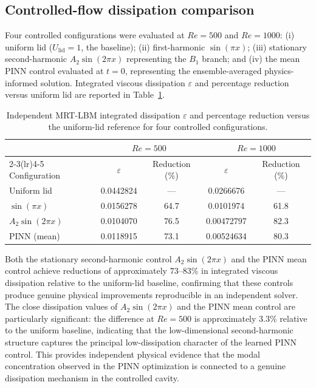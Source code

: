 \documentclass[a4paper,11pt]{article}
\begin{document}
\subsection{Controlled-flow dissipation comparison}

Four controlled configurations were evaluated at \(Re=500\) and \(Re=1000\):
(i) uniform lid (\(U_{\mathrm{lid}}=1\), the baseline); (ii) first-harmonic
\(\sin(\pi x)\); (iii) stationary second-harmonic \(A_2\sin(2\pi x)\) representing
the \(B_1\) branch; and (iv) the mean PINN control evaluated at \(t=0\),
representing the ensemble-averaged physics-informed solution. Integrated viscous
dissipation \(\varepsilon\) and percentage reduction versus uniform lid are
reported in Table~\ref{tab:lbm_dissipation}.

\begin{table}[t]
\centering
\caption{Independent MRT-LBM integrated dissipation \(\varepsilon\) and percentage
reduction versus the uniform-lid reference for four controlled configurations.}
\label{tab:lbm_dissipation}
\small
\begin{tabular}{lcccc}
\toprule
& \multicolumn{2}{c}{\(Re=500\)} & \multicolumn{2}{c}{\(Re=1000\)}\\
\cmidrule(lr){2-3}\cmidrule(lr){4-5}
Configuration & \(\varepsilon\) & Reduction (\%) & \(\varepsilon\) & Reduction (\%)\\
\midrule
Uniform lid         & 0.0442824  & ---  & 0.0266676  & ---\\
\(\sin(\pi x)\)     & 0.0156278  & 64.7 & 0.0101974  & 61.8\\
\(A_2\sin(2\pi x)\) & 0.0104070  & 76.5 & 0.00472797 & 82.3\\
PINN (mean)         & 0.0118915  & 73.1 & 0.00524634 & 80.3\\
\bottomrule
\end{tabular}
\end{table}

Both the stationary second-harmonic control \(A_2\sin(2\pi x)\) and the PINN mean
control achieve reductions of approximately \(73\)--\(83\%\) in integrated viscous
dissipation relative to the uniform-lid baseline, confirming that these controls
produce genuine physical improvements reproducible in an independent solver.
The close dissipation values of \(A_2\sin(2\pi x)\) and the PINN mean control
are particularly significant: the difference at \(Re=500\) is approximately
\(3.3\%\) relative to the uniform baseline, indicating that the low-dimensional
second-harmonic structure captures the principal low-dissipation character of
the learned PINN control. This provides independent physical evidence that the
modal concentration observed in the PINN optimization is connected to a genuine
dissipation mechanism in the controlled cavity.
\end{document}
